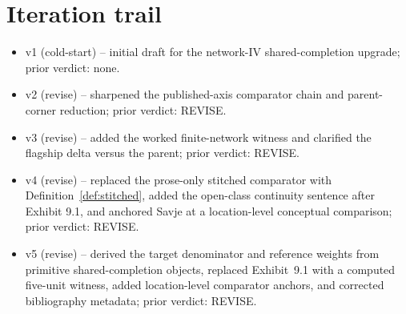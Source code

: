 \documentclass[11pt]{article}
\theoremstyle{definition}
\theoremstyle{plain}
\theoremstyle{remark}
\begin{document}
\section{Iteration trail}
\begin{itemize}[leftmargin=*]
\item v1 (cold-start) -- initial draft for the network-IV shared-completion upgrade; prior verdict: none.
\item v2 (revise) -- sharpened the published-axis comparator chain and parent-corner reduction; prior verdict: REVISE.
\item v3 (revise) -- added the worked finite-network witness and clarified the flagship delta versus the parent; prior verdict: REVISE.
\item v4 (revise) -- replaced the prose-only stitched comparator with Definition~\ref{def:stitched}, added the open-class continuity sentence after Exhibit 9.1, and anchored Savje at a location-level conceptual comparison; prior verdict: REVISE.
\item v5 (revise) -- derived the target denominator and reference weights from primitive shared-completion objects, replaced Exhibit~9.1 with a computed five-unit witness, added location-level comparator anchors, and corrected bibliography metadata; prior verdict: REVISE.
\end{itemize}
\end{document}
